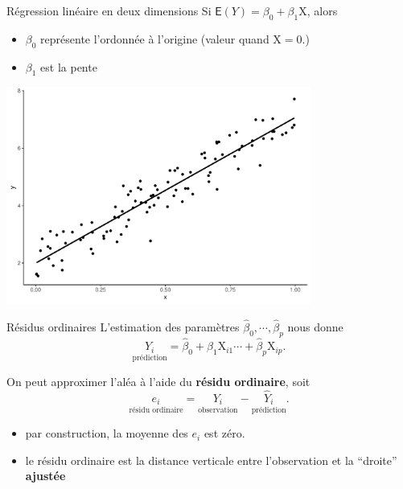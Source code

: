 \documentclass[
  ignorenonframetext,
]{beamer}
\providecommand{\tightlist}{%
  \setlength{\itemsep}{0pt}\setlength{\parskip}{0pt}}\usepackage{longtable,booktabs,array}
\begin{document}
\begin{frame}{Régression linéaire en deux dimensions}
\label{ruxe9gression-linuxe9aire-en-deux-dimensions}
Si \(\mathsf{E}(Y)=\beta_0 + \beta_1 \mathrm{X}\), alors

\begin{itemize}
\tightlist
\item
  \(\beta_0\) représente l'ordonnée à l'origine (valeur quand
  \(\mathrm{X}=0\).)
\item
  \(\beta_1\) est la pente
\end{itemize}

\begin{center}
\includegraphics[width=0.75\textwidth,height=\textheight]{MATH60602-diapos3_files/figure-beamer/unnamed-chunk-1-1.pdf}
\end{center}
\end{frame}

\begin{frame}{Résidus ordinaires}
\label{ruxe9sidus-ordinaires}
L'estimation des paramètres
\(\widehat{\beta}_0, \cdots,  \widehat{\beta}_p\) nous donne
\[\underset{\text{prédiction}}{\widehat{Y}_i} = \widehat{\beta}_0 + \widehat{\beta}_1\mathrm{X}_{i1} \cdots + \widehat{\beta}_p\mathrm{X}_{ip}.\]

On peut approximer l'aléa à l'aide du \textbf{résidu ordinaire}, soit
\[\underset{\text{résidu ordinaire}}{e_i} = \underset{\text{observation}}{Y_i} - \underset{\text{prédiction}}{\widehat{Y}_i}.\]

\begin{itemize}
\tightlist
\item
  par construction, la moyenne des \(e_i\) est zéro.
\item
  le résidu ordinaire est la distance verticale entre l'observation et
  la ``droite'' \textbf{ajustée}
\end{itemize}
\end{frame}
\end{document}
